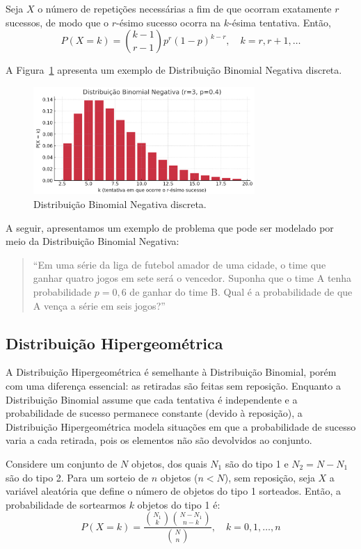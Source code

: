 \documentclass{article}
\begin{document}
Seja $X$ o número de repetições necessárias a fim de que ocorram exatamente $r$ sucessos, de modo que o $r$-ésimo sucesso ocorra na $k$-ésima tentativa. Então,
    $$
    P(X = k) = \binom{k - 1}{r - 1} p^r (1 - p)^{k - r}, \quad k = r, r + 1, \ldots
    $$

A Figura~\ref{fig:dist_disc_binomial_negativa} apresenta um exemplo de Distribuição Binomial Negativa discreta.

\begin{figure}[H]
    \centering
    \includegraphics[width=0.75\textwidth]{figuras/dist_disc_binomial_negativa.png}
    \caption{Distribuição Binomial Negativa discreta.}
    \label{fig:dist_disc_binomial_negativa}
\end{figure}

A seguir, apresentamos um exemplo de problema que pode ser modelado por meio da Distribuição Binomial Negativa:
\begin{quote}
``Em uma série da liga de futebol amador de uma cidade, o time que ganhar quatro jogos em sete será o vencedor. Suponha que o time
A tenha probabilidade $p = 0,6$ de ganhar do time B. Qual é a probabilidade de que A vença a série em seis jogos?''
\end{quote}

\subsection{Distribuição Hipergeométrica}
A Distribuição Hipergeométrica é semelhante à Distribuição Binomial, porém com uma diferença essencial: as retiradas são feitas sem reposição. Enquanto a Distribuição Binomial assume que cada tentativa é independente e a probabilidade de sucesso permanece constante (devido à reposição), a Distribuição Hipergeométrica modela situações em que a probabilidade de sucesso varia a cada retirada, pois os elementos não são devolvidos ao conjunto.

Considere um conjunto de $N$ objetos, dos quais $N_1$ são do tipo 1 e $N_2 = N - N_1$ são do tipo 2.  
Para um sorteio de $n$ objetos ($n < N$), sem reposição, seja $X$ a variável aleatória que define o número de objetos do tipo 1 sorteados.  
Então, a probabilidade de sortearmos $k$ objetos do tipo 1 é:
    $$
    P(X = k) = \frac{\binom{N_1}{k} \binom{N - N_1}{n - k}}{\binom{N}{n}}, \quad k = 0, 1, \ldots, n
    $$
\end{document}
